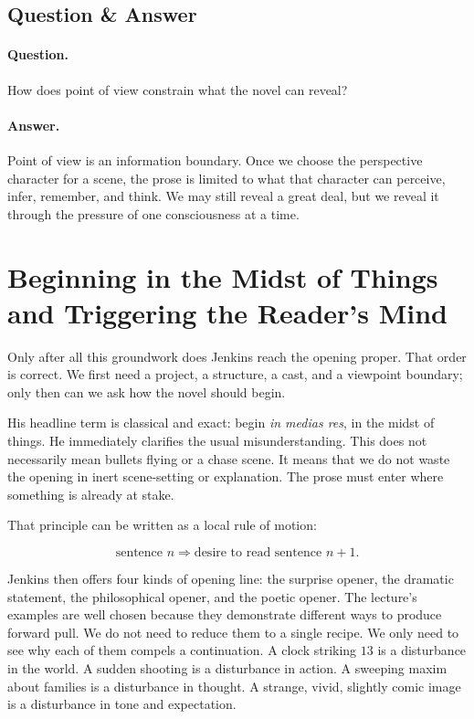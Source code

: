 \subsection{Question \& Answer}

\paragraph{Question.} How does point of view constrain what the novel can reveal?

\paragraph{Answer.} Point of view is an information boundary. Once we choose the perspective character for a scene, the prose is limited to what that character can perceive, infer, remember, and think. We may still reveal a great deal, but we reveal it through the pressure of one consciousness at a time.

\section{Beginning in the Midst of Things and Triggering the Reader's Mind}

Only after all this groundwork does Jenkins reach the opening proper. That order is correct. We first need a project, a structure, a cast, and a viewpoint boundary; only then can we ask how the novel should begin.

His headline term is classical and exact: begin \emph{in medias res}, in the midst of things. He immediately clarifies the usual misunderstanding. This does not necessarily mean bullets flying or a chase scene. It means that we do not waste the opening in inert scene-setting or explanation. The prose must enter where something is already at stake.

That principle can be written as a local rule of motion:

\begin{equation}
\text{sentence } n \Rightarrow \text{desire to read sentence } n+1.
\end{equation}

Jenkins then offers four kinds of opening line: the surprise opener, the dramatic statement, the philosophical opener, and the poetic opener. The lecture's examples are well chosen because they demonstrate different ways to produce forward pull. We do not need to reduce them to a single recipe. We only need to see why each of them compels a continuation. A clock striking \(13\) is a disturbance in the world. A sudden shooting is a disturbance in action. A sweeping maxim about families is a disturbance in thought. A strange, vivid, slightly comic image is a disturbance in tone and expectation.

